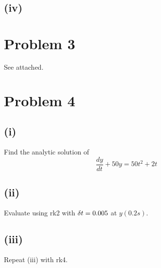 \documentclass{article}
\begin{document}
\subsection*{(iv)}
\vspace{60 mm}

\section*{Problem 3}
See attached.

\section*{Problem 4}

\subsection*{(i)}
Find the analytic solution of
$$ \frac{dy}{dt} + 50y = 50t^{2} + 2t$$
\vspace{60 mm}

\subsection*{(ii)}
Evaluate using rk2 with $\delta\/t = 0.005$ at $y(0.2s)$.
\vspace{30 mm}

\subsection*{(iii)}
Repeat (iii) with rk4.
\end{document}
